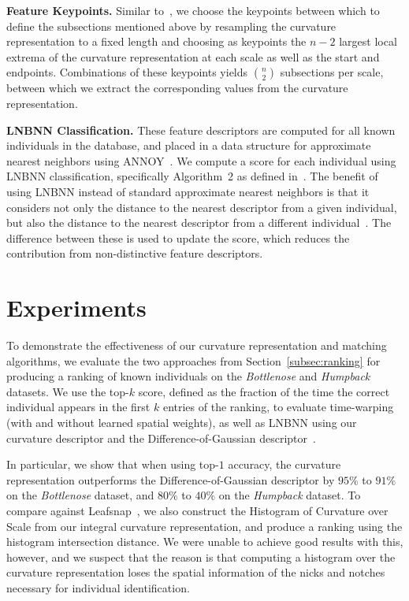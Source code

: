 \documentclass[10pt,twocolumn,letterpaper]{article}
\begin{document}
\textbf{Feature Keypoints.}
Similar to~\cite{Hughes16}, we choose the keypoints between which to define the subsections mentioned
above by resampling the curvature representation to a fixed length and choosing as
keypoints the $n - 2$ largest local extrema of the curvature representation at each
scale as well as the start and endpoints.  Combinations of these
keypoints yields ${n}\choose 2$ subsections per scale, between which we
extract the corresponding values from the curvature representation.

\textbf{LNBNN Classification.}
These feature descriptors are computed for all known
individuals in the database, and placed in a data structure for approximate
nearest neighbors using ANNOY~\cite{Bernhardsson13}.  We compute a score for
each individual using LNBNN classification, specifically Algorithm~2 as defined
in~\cite{McCann12}. The benefit of using LNBNN instead of standard approximate
nearest neighbors is that it considers not only the distance to the nearest
descriptor from a given individual, but also the distance to the nearest descriptor
from a different individual~\cite{Crall13}.  The difference between these is
used to update the score, which  reduces the contribution from non-distinctive
feature descriptors.

\section{Experiments}
\label{sec:experiments}
To demonstrate the effectiveness of our curvature representation and matching
algorithms, we evaluate the two approaches from Section~\ref{subsec:ranking}
for producing a ranking of known individuals on the \emph{Bottlenose} and
\emph{Humpback} datasets.  We use the top-$k$ score, defined as the fraction of
the time the correct individual appears in the first $k$ entries of the
ranking, to evaluate time-warping (with and without learned spatial
weights), as well as LNBNN using our curvature descriptor and the
Difference-of-Gaussian descriptor~\cite{Hughes16}.

In particular, we show that when using top-$1$ accuracy,
the curvature representation outperforms the Difference-of-Gaussian descriptor
by $95\%$ to $91\%$ on the \emph{Bottlenose}
dataset, and $80\%$ to $40\%$ on the \emph{Humpback} dataset.
To compare against Leafsnap~\cite{Kumar12}, we also construct the Histogram
of Curvature over Scale from our integral curvature representation, and
produce a ranking using the histogram intersection distance.  We were unable
to achieve good results with this, however, and we suspect that the reason is
that computing a histogram over the curvature representation loses the spatial
information of the nicks and notches necessary for individual identification.
\end{document}
